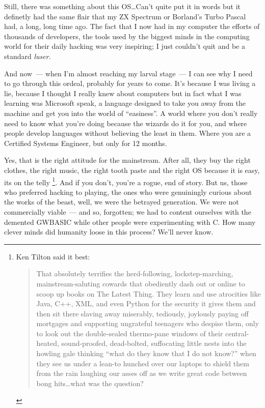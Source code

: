 \documentclass{book}
\begin{document}
Still, there was something about this OS\ldots Can't quite put it in
words but it definetly had the same flair that my ZX Spectrum or
Borland's Turbo Pascal had, a long, long time ago. The fact that I now
had in my computer the efforts of thousands of developers, the tools
used by the biggest minds in the computing world for their daily
hacking was very inspiring; I just couldn't quit and be a standard
\emph{luser}.

And now~--- when I'm almost reaching my larval stage~--- I can see why
I need to go through this ordeal, probably for years to come. It's
because I was living a lie, because I thought I really knew about
computers but in fact what I was learning was Microsoft speak, a
language designed to take you away from the machine and get you into
the world of ``easiness''. A world where you don't really need to know
what you're doing because the wizards do it for you, and where people
develop languages without believing the least in them. Where you are a
Certified Systems Engineer, but only for 12 months.

Yes, that is the right attitude for the mainstream. After all, they
buy the right clothes, the right music, the right tooth paste and the
right OS because it is easy, its on the telly
\footnote{Ken Tilton said it best:
  \begin{quote}
    That absolutely terrifies the herd-following, lockstep-marching,
    mainstream-saluting cowards that obediently dash out or online to
    scoop up books on The Latest Thing. They learn and use atrocities
    like Java, C++, XML, and even Python for the security it gives
    them and then sit there slaving away miserably, tediously,
    joylously paying off mortgages and supporting ungrateful teenagers
    who despise them, only to look out the double-sealed thermo-pane
    windows of their central-heated, sound-proofed, dead-bolted,
    suffocating little nests into the howling gale thinking ``what do
    they know that I do not know?'' when they see us under a lean-to
    hunched over our laptops to shield them from the rain laughing our
    asses off as we write great code between bong hits\ldots what was
    the question?
  \end{quote}
}. And if you don't, you're a rogue, end of story. But us, those who
preferred hacking to playing, the ones who were genuiningly curious
about the works of the beast, well, we were the betrayed
generation. We were not commercially viable~--- and so, forgotten; we
had to content ourselves with the demented GWBASIC while other people
were experimenting with C. How many clever minds did humanity loose in
this process? We'll never know.
\end{document}
